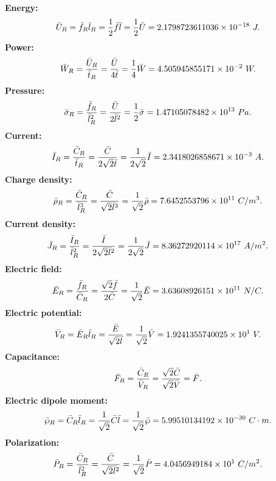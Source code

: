 \documentclass[12pt,a4paper]{article}
\def\barury{2.1798723611036\times 10^{-18}}
\def\barwry{4.505945855171\times 10^{-2}}
\def\barprry{1.47105078482\times 10^{13}}
\def\bariry{2.3418026858671\times 10^{-3}}
\def\barrhory{7.6452553796\times 10^{11}}
\def\barcurry{8.36272920114\times 10^{17}}
\def\barery{3.63608926151\times 10^{11}}
\def\barphiry{1.9241355740025\times 10^{1}}
\def\bardipry{5.99510134192\times 10^{-30}}
\def\barpolarry{4.0456949184\times 10^{1}}
\begin{document}
{\begin{equation}
\end{equation}
{\bf Energy:}
\begin{equation}
\bar U_R={\bar f_R \bar l_R}= {1\over 2} \bar f \bar l
= {1\over 2} \bar U=\barury\ J.
\end{equation}
{\bf Power:}
\begin{equation}
\bar W_R={\bar U_R \over \bar t_R}= {\bar U \over 4 \bar t}
= {1\over 4} \bar W=\barwry\ W.
\end{equation}
{\bf Pressure:}
\begin{equation}
\bar \sigma_R={\bar f_R \over \bar l_R^2}= {\bar U \over 2 \bar l^2}
= {1\over 2} \bar \sigma=\barprry\ Pa.
\end{equation}
{\bf Current:}
\begin{equation}
\bar I_R={\bar C_R \over \bar t_R}= {\bar C \over 2 \sqrt{2} \bar t}
= {1\over 2 \sqrt{2}} \bar I=\bariry\ A.
\end{equation}
{\bf Charge density:}
\begin{equation}
\bar \rho_R={\bar C_R \over \bar l_R^3}= {\bar C \over \sqrt{2} \bar l^3}
= {1\over \sqrt{2}} \bar \rho=\barrhory\ C/m^3.
\end{equation}
{\bf Current density:}
\begin{equation}
\bar J_R={\bar I_R \over \bar l_R^2}= {\bar I \over 2 \sqrt{2} \bar l^2}
= {1\over 2 \sqrt{2}} \bar J=\barcurry\ A/m^2.
\end{equation}
{\bf Electric field:}
\begin{equation}
\bar E_R={\bar f_R \over \bar C_R}= {\sqrt{2}\bar f \over 2 \bar C}
= {1\over \sqrt{2}} \bar E=\barery\ N/C.
\end{equation}
{\bf Electric potential:}
\begin{equation}
\bar V_R={\bar E_R \bar l_R}= {\bar E \over \sqrt{2} \bar l}
= {1\over \sqrt{2}} \bar V=\barphiry\ V.
\end{equation}
{\bf Capacitance:}
\begin{equation}
\bar F_R={\bar C_R \over \bar V_R}= {\sqrt{2} \bar C \over \sqrt{2} \bar V}
= \bar F.
\end{equation}
{\bf Electric dipole moment:}
\begin{equation}
\bar \wp_R={\bar C_R \bar l_R}= {1\over \sqrt{2}} \bar C \bar l 
= {1\over \sqrt{2}} \bar \wp=\bardipry\ C\cdot m.
\end{equation}
{\bf Polarization:}
\begin{equation}
\bar P_R={\bar C_R \over \bar l_R^2}= {\bar C \over \sqrt{2} \bar l^2}
= {1\over \sqrt{2}} \bar P=\barpolarry\ C/m^2.

\end{equation}}
\end{document}
